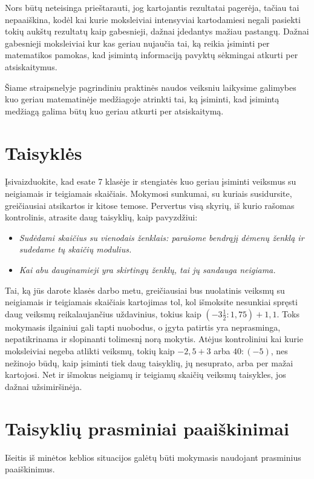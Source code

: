 \documentclass{article}
\begin{document}
Nors būtų neteisinga prieštarauti, jog kartojantis rezultatai pagerėja, tačiau tai nepaaiškina, kodėl kai kurie moksleiviai intensyviai kartodamiesi negali pasiekti tokių aukštų rezultatų kaip gabesnieji, dažnai įdedantys mažiau pastangų. Dažnai gabesnieji moksleiviai kur kas geriau nujaučia tai, ką reikia įsiminti per matematikos pamokas, kad įsimintą informaciją pavyktų sėkmingai atkurti per atsiskaitymus.

Šiame straipsnelyje pagrindiniu praktinės naudos veiksniu laikysime galimybes kuo geriau matematinėje medžiagoje atrinkti tai, ką įsiminti, kad įsimintą medžiagą galima būtų kuo geriau atkurti per atsiskaitymą.

\section*{Taisyklės}
Įsivaizduokite, kad esate 7 klasėje ir stengiatės kuo geriau įsiminti veiksmus su neigiamais ir teigiamais skaičiais. Mokymosi sunkumai, su kuriais susidursite, greičiausiai atsikartos ir kitose temose. Pervertus visą skyrių, iš kurio rašomas kontrolinis, atrasite daug taisyklių, kaip pavyzdžiui:
\begin{itemize}
\item \textit{Sudėdami skaičius su vienodais ženklais: parašome bendrąjį dėmenų ženklą ir sudedame tų skaičių modulius.}
\item \textit{Kai abu dauginamieji yra skirtingų ženklų, tai jų sandauga neigiama.}
\end{itemize}

Tai, ką jūs darote klasės darbo metu, greičiausiai bus nuolatinis veiksmų su neigiamais ir teigiamais skaičiais kartojimas tol, kol išmoksite nesunkiai spręsti daug veiksmų reikalaujančius uždavinius, tokius kaip $\left(-3\frac{1}{2}: 1,75\right)+1,1$. Toks mokymasis ilgainiui gali tapti nuobodus, o įgyta patirtis yra neprasminga, nepatikrinama ir slopinanti tolimesnį norą mokytis. Atėjus kontroliniui kai kurie moksleiviai negeba atlikti veiksmų, tokių kaip $-2,5+3$ arba $40:(-5)$, nes nežinojo būdų, kaip įsiminti tiek daug taisyklių, jų nesuprato, arba per mažai kartojosi. Net ir išmokus neigiamų ir teigiamų skaičių veiksmų taisykles, jos dažnai užsimiršinėja.

\newpage
\section*{Taisyklių prasminiai paaiškinimai}
Išeitis iš minėtos keblios situacijos galėtų būti mokymasis naudojant prasminius paaiškinimus. 
\end{document}
